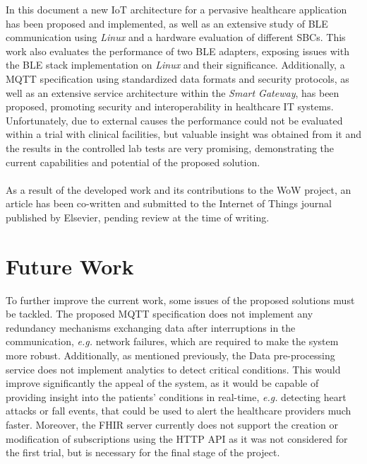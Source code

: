 



In this document a new \acs{IoT} architecture for a pervasive healthcare application has been proposed and implemented, as well as an extensive study of \acs{BLE} communication using \textit{Linux} and a hardware evaluation of different \acs{SBC}s. This work also evaluates the performance of two \acs{BLE} adapters, exposing issues with the \acs{BLE} stack implementation on \textit{Linux} and their significance. Additionally, a \acs{MQTT} specification using standardized data formats and security protocols, as well as an extensive service architecture within the \textit{Smart Gateway}, has been proposed, promoting security and interoperability in healthcare \acs{IT} systems. Unfortunately, due to external causes the performance could not be evaluated within a trial with clinical facilities, but valuable insight was obtained from it and the results in the controlled lab tests are very promising, demonstrating the current capabilities and potential of the proposed solution. 

\paragraph{} As a result of the developed work and its contributions to the \acs{WoW} project, an article \cite{Fama2021} has been co-written and submitted to the Internet of Things journal published by Elsevier, pending review at the time of writing. 

\section{Future Work}

To further improve the current work, some issues of the proposed solutions must be tackled. The proposed \acs{MQTT} specification does not implement any redundancy mechanisms exchanging data after interruptions in the communication, \textit{e.g.} network failures, which are required to make the system more robust. Additionally, as mentioned previously, the Data pre-processing service does not implement analytics to detect critical conditions. This would improve significantly the appeal of the system, as it would be capable of providing insight into the patients' conditions in real-time, \textit{e.g.} detecting heart attacks or fall events, that could be used to alert the healthcare providers much faster. Moreover, the \acs{FHIR} server currently does not support the creation or modification of subscriptions using the \acs{HTTP} \acs{API} as it was not considered for the first trial, but is necessary for the final stage of the project. 